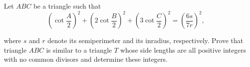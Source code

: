 Let $ABC$ be a triangle such that\[ \left( \cot \dfrac{A}{2} \right)^2 + \left( 2\cot \dfrac{B}{2} \right)^2 + \left( 3\cot \dfrac{C}{2} \right)^2 = \left( \dfrac{6s}{7r} \right)^2,  \]

where $s$ and $r$ denote its semiperimeter and its inradius, respectively. Prove that triangle $ABC$ is similar to a triangle $T$ whose side lengths are all positive integers with no common divisors and determine these integers.